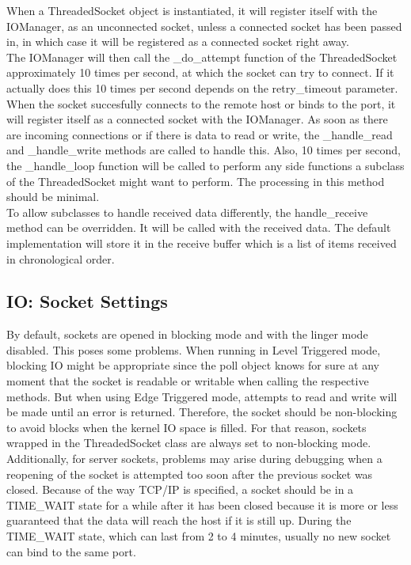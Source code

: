 \documentclass[a4paper, 10pt, oneside]{article}
\begin{document}
When a ThreadedSocket object is instantiated, it will register itself with the
IOManager, as an unconnected socket, unless a connected socket has been passed
in, in which case it will be registered as a connected socket right away.\\

The IOManager will then call the \_do\_attempt function of the ThreadedSocket
approximately 10 times per second, at which the socket can try to connect. If it
actually does this 10 times per second depends on the retry\_timeout
parameter.\\

When the socket succesfully connects to the remote host or binds to the port, it
will register itself as a connected socket with the IOManager. As soon as there
are incoming connections or if there is data to read or write, the
\_handle\_read and \_handle\_write methods are called to handle this. Also, 10
times per second, the \_handle\_loop function will be called to perform any side
functions a subclass of the ThreadedSocket might want to perform. The processing
in this method should be minimal.\\

To allow subclasses to handle received data differently, the handle\_receive
method can be overridden. It will be called with the received data. The default
implementation will store it in the receive buffer which is a list of items
received in chronological order.

\subsection{IO: Socket Settings}
By default, sockets are opened in blocking mode and with the linger mode
disabled. This poses some problems. When running in Level Triggered mode,
blocking IO might be appropriate since the poll object knows for sure at any
moment that the socket is readable or writable when calling the respective
methods. But when using Edge Triggered mode, attempts to read and write will be
made until an error is returned. Therefore, the socket should be non-blocking to
avoid blocks when the kernel IO space is filled. For that reason, sockets
wrapped in the ThreadedSocket class are always set to non-blocking mode.
Additionally, for server sockets, problems may arise during debugging when a
reopening of the socket is attempted too soon after the previous socket was
closed. Because of the way TCP/IP is specified, a socket should be in a
TIME\_WAIT state for a while after it has been closed because it is more or less
guaranteed that the data will reach the host if it is still up. During the
TIME\_WAIT state, which can last from 2 to 4 minutes, usually no new socket can
bind to the same port. \\
\end{document}
